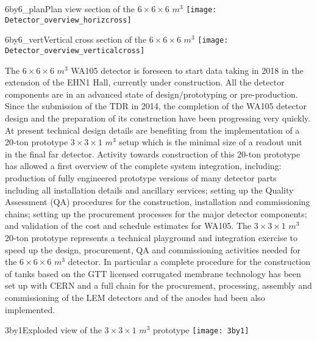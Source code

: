 \begin{cdrfigure}{6by6_plan}{\small Plan view section of the $6\times 6\times 6$ $m^3$ }
\texttt{[image: Detector\_overview\_horizcross]}
\end{cdrfigure}

\begin{cdrfigure}{6by6_vert}{\small Vertical cross section of the $6\times 6\times 6$ $m^3$}
\texttt{[image: Detector\_overview\_verticalcross]}
\end{cdrfigure}


The $6\times 6\times 6$ $m^3$  WA105 detector is foreseen to start data taking in 2018 in the extension of the EHN1 Hall, currently under construction. All the detector components are in an advanced state of design/prototyping or pre-production. Since the submission of the TDR in 2014, the completion of the WA105 detector design and the preparation of its construction have been progressing very quickly.  At present technical design details are benefiting from the implementation of a 20-ton prototype  $3 \times 3 \times 1$ $m^3$  setup which is the minimal size of a readout unit in the final far detector.  Activity towards construction of this 20-ton prototype has allowed a first overview of the complete system integration, including:  production of fully engineered prototype versions of many detector parts including all installation details and ancillary services; setting up the Quality Assessment (QA) procedures for the construction, installation and commissioning chains; setting up the procurement processes for the major detector components; and validation of the cost and schedule estimates for WA105.  The  $3 \times 3 \times 1$ $m^3$ 20-ton prototype  represents a technical playground and integration exercise to speed up the design, procurement, QA and commissioning activities needed for the  $6\times 6\times 6$ $m^3$ detector.  In particular a complete procedure for the construction of tanks based on the GTT licensed corrugated membrane technology has been set up with CERN and a full chain for the procurement, processing, assembly and commissioning of the LEM detectors and of the anodes had been also implemented.

\begin{cdrfigure}{3by1}{Exploded view of the  $3\times 3\times 1$  $m^3$  prototype}
\texttt{[image: 3by1]}
\end{cdrfigure} 